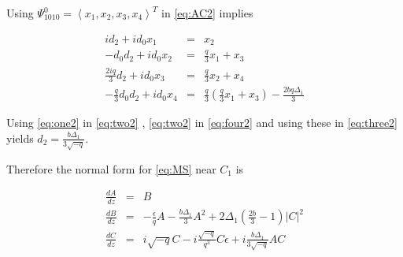 Using $\Psi_{1010}^0 = \left<x_1,x_2,x_3,x_4\right>^T$ in \eqref{eq:AC2} implies 

\begin{subequations}
\begin{eqnarray}
i d_2 + i d_0 x_1 &=& x_2 \label{eq:one2} \\
- d_0 d_2 + i d_0 x_2 &=& \frac{q}{3} x_1 + x_3 \label{eq:two2} \\
\frac{2 i q}{3} d_2 + i d_0 x_3 &=& \frac{q}{3} x_2 + x_4  \label{eq:three2} \\
- \frac{q}{3} d_0 d_2 + i d_0 x_4 &=& \frac{q}{3}\left(\frac{q}{3} x_1 + x_3 \right) - \frac{ 2 b q \Delta_1} {3} \label{eq:four2}
\end{eqnarray}
\end{subequations}

Using \eqref{eq:one2} in \eqref{eq:two2} , \eqref{eq:two2} in \eqref{eq:four2} and
using these in \eqref{eq:three2} yields $ d_2 = \frac{ b \Delta_1 }{ 3 \sqrt{-q} }$.

Therefore the normal form for \eqref{eq:MS} near $C_1$ is 

\begin{subequations}\label{eq:NORMAL2}
\begin{eqnarray} 
\frac{dA}{dz} &=& B  \label{eq:normalA2} \\
\frac{dB}{dz} &=& -\frac{\epsilon}{q} A - \frac{b \Delta_1 }{3} A^2 + 2 \Delta_1 \left(\frac{2 b }{3} - 1\right) \left|C\right|^2  \label{eq:normalB2} \\
\frac{dC}{dz} &=& i \sqrt{-q} C - i \frac{\sqrt{-q} }{q^3} C\epsilon + i \frac{b \Delta_1}{3 \sqrt{-q}} A C \label{eq:normalC2}
\end{eqnarray}
\end{subequations}

